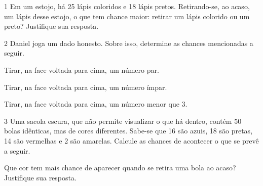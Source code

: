 \begin{mdframed}[linewidth=2pt,linecolor=salmao,roundcorner=2pt]

\num{1} Em um estojo, há 25 lápis coloridos e 18 lápis pretos. Retirando-se, ao
acaso, um lápis desse estojo, o que tem chance maior: retirar um lápis
colorido ou um preto? Justifique sua resposta.

\begin{mdframed}[linewidth=2pt,linecolor=salmao,roundcorner=2pt]
\end{mdframed}

\num{2} Daniel joga um dado honesto. Sobre isso, determine as chances mencionadas a seguir.

\begin{escolha}
\item
  Tirar, na face voltada para cima, um número par.


\item
  Tirar, na face voltada para cima, um número ímpar.


\item
  Tirar, na face voltada para cima, um número menor que 3.

\end{escolha}

\num{3} Uma sacola escura, que não permite visualizar o que há dentro, contém
50 bolas idênticas, mas de cores diferentes. Sabe-se que 16 são azuis,
18 são pretas, 14 são vermelhas e 2 são amarelas. Calcule as chances de
acontecer o que se prevê a seguir.

\begin{escolha}
\item
  Que cor tem mais chance de aparecer quando se retira uma bola ao acaso? Justifique sua resposta.



\end{escolha}
\end{mdframed}
